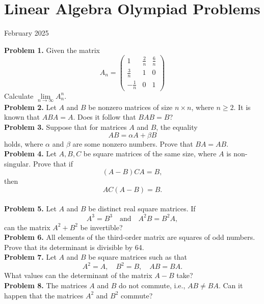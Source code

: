 \documentclass{article}
\begin{document}
\pagestyle{plain}

\section*{Linear Algebra Olympiad Problems}

\begin{center}
February 2025
\end{center}

\textbf{Problem 1.}
Given the matrix
\[
A_n = \begin{pmatrix}
1 & \frac{2}{n} & \frac{6}{n} \\
\frac{3}{n} & 1 & 0 \\
-\frac{1}{n} & 0 & 1
\end{pmatrix}
\]
Calculate \( \lim\limits_{n \to \infty} A_n^n \).
\\

\textbf{Problem 2.}
Let \( A \) and \( B \) be nonzero matrices of size \( n \times n \), where \( n \geq 2 \).
It is known that \( ABA = A \). Does it follow that \( BAB = B \)?
\\

\textbf{Problem 3.}
Suppose that for matrices \( A \) and \( B \), the equality
\[
AB = \alpha A + \beta B
\]
holds, where \( \alpha \) and \( \beta \) are some nonzero numbers. Prove that \( BA = AB \).
\\

\textbf{Problem 4.}
Let \( A, B, C \) be square matrices of the same size, where \( A \) is non-singular. Prove that if
\[
(A - B)CA = B,
\]
then
\[
AC(A - B) = B.
\]
\\

\textbf{Problem 5.}
Let \( A \) and \( B \) be distinct real square matrices. If
\[
A^3 = B^3 \quad \text{and} \quad A^2 B = B^2 A,
\]
can the matrix \( A^2 + B^2 \) be invertible?
\\

\textbf{Problem 6.}
All elements of the third-order matrix are squares of odd numbers.
Prove that its determinant is divisible by 64.
\\

\textbf{Problem 7.}
Let \( A \) and \( B \) be square matrices such as that
\[
A^2 = A, \quad B^2 = B, \quad AB = BA.
\]
What values can the determinant of the matrix \( A - B \) take?
\\

\textbf{Problem 8.}
The matrices \( A \) and \( B \) do not commute, i.e., \( AB \neq BA \). Can it happen that the matrices \( A^2 \) and \( B^2 \) commute?
\\
\end{document}
